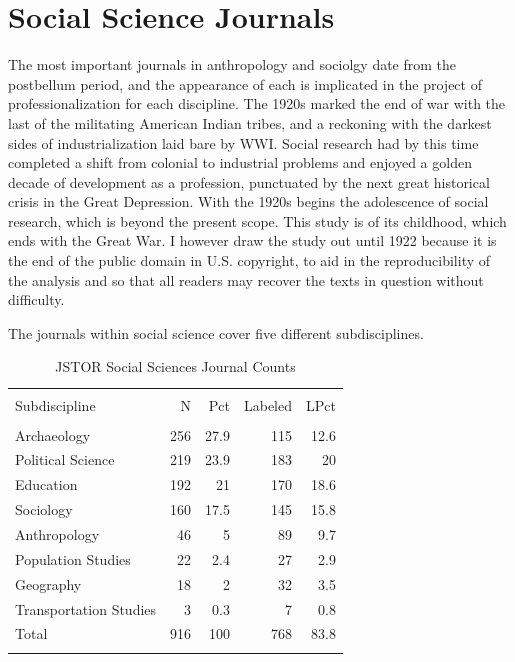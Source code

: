 \documentclass[]{book}
\theoremstyle{definition}
\theoremstyle{definition}
\theoremstyle{definition}
\theoremstyle{remark}
\begin{document}
\hypertarget{kd-dq2}{%
\section{\texorpdfstring{ Social Science
Journals}{ Social Science Journals}}\label{kd-dq2}}

The most important journals in anthropology and sociolgy date from the
postbellum period, and the appearance of each is implicated in the
project of professionalization for each discipline. The 1920s marked the
end of war with the last of the militating American Indian tribes, and a
reckoning with the darkest sides of industrialization laid bare by WWI.
Social research had by this time completed a shift from colonial to
industrial problems and enjoyed a golden decade of development as a
profession, punctuated by the next great historical crisis in the Great
Depression. With the 1920s begins the adolescence of social research,
which is beyond the present scope. This study is of its childhood, which
ends with the Great War. I however draw the study out until 1922 because
it is the end of the public domain in U.S. copyright, to aid in the
reproducibility of the analysis and so that all readers may recover the
texts in question without difficulty.

The journals within social science cover five different subdisciplines.

\begin{table}[!htbp] \centering 
  \caption{JSTOR Social Sciences Journal Counts} 
  \label{tab:jclu-tab-sub} 
\begin{tabular}{@{\extracolsep{5pt}} lrrrr} 
\\[-1.8ex]\hline 
\hline \\[-1.8ex] 
Subdiscipline & N & Pct & Labeled & LPct \\ 
\hline \\[-1.8ex] 
Archaeology & 256 & 27.9 & 115 & 12.6 \\ 
Political Science & 219 & 23.9 & 183 & 20 \\ 
Education & 192 & 21 & 170 & 18.6 \\ 
Sociology & 160 & 17.5 & 145 & 15.8 \\ 
Anthropology & 46 & 5 & 89 & 9.7 \\ 
Population Studies & 22 & 2.4 & 27 & 2.9 \\ 
Geography & 18 & 2 & 32 & 3.5 \\ 
Transportation Studies & 3 & 0.3 & 7 & 0.8 \\ 
Total & 916 & 100 & 768 & 83.8 \\ 
\hline \\[-1.8ex] 
\end{tabular} 
\end{table}
\end{document}
